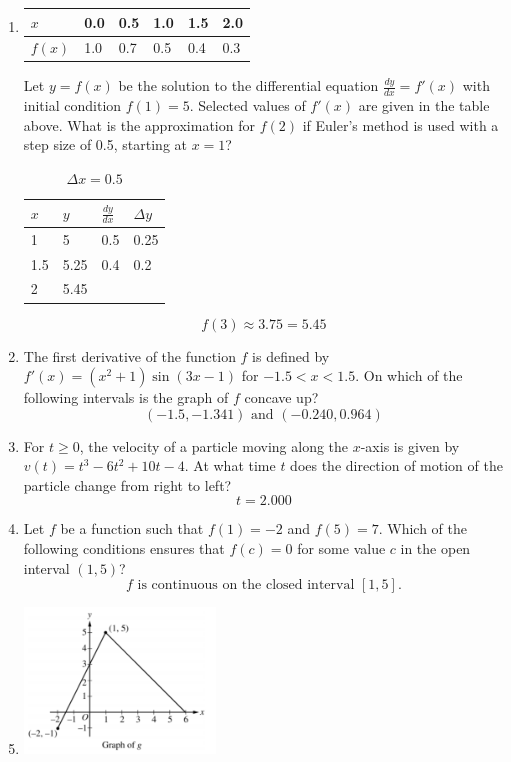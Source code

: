 \documentclass[12pt]{article}
\begin{document}
\begin{enumerate}
    \item 
    \begin{table}[h!]
        \centering
        \begin{tabular}{|l||l|l|l|l|l|}
        \hline
        $x$    & 0.0 & 0.5 & 1.0 & 1.5 & 2.0 \\ \hline
        $f(x)$ & 1.0  & 0.7  & 0.5  & 0.4  & 0.3  \\ \hline
        \end{tabular}
        \end{table}
    Let $y = f(x)$  be the solution to the differential equation $\frac{dy}{dx}=f'(x)$ with initial condition  $f(1) = 5$. Selected values of $f'(x)$  are given in the table above. What is the approximation for $f(2)$  if Euler's method is used with a step size of 0.5, starting at $x= 1$?
    \begin{table}[h]
        \centering
        \caption{$\Delta x = 0.5$}
        \begin{tabular}{l|l|l|l}
        $x$ & \multicolumn{1}{l|}{$y$} & \multicolumn{1}{l|}{$\frac{dy}{dx}$} & $\Delta y$ \\ \hline
        1 & 5 & 0.5 & 0.25 \\
        1.5 & 5.25 & 0.4 & 0.2 \\
        2 & 5.45 &  & 
        \end{tabular}
        \end{table}
        $$f(3)\approx 3.75 = \boxed{5.45}$$
    \item The first derivative of the function $f$ is defined by $f'(x) = (x^2 +1)\sin(3x - 1)$ for $-1.5 < x < 1.5$. On which of the following intervals is the graph of $f$ concave up?
    $$\boxed{(-1.5, -1.341) \text{ and } (-0.240, 0.964)}$$
    \item For  $t \geq 0$, the velocity of a particle moving along the $x$-axis is given by  $v(t) =t^3-6t^2+ 10t- 4$. At what time $t$ does the direction of motion of the particle change from right to left?
    $$\boxed{t=2.000}$$
    \item Let $f$ be a function such that $f (1) = -2$ and $f (5) = 7$. Which of the following conditions ensures that $f(c) = 0$ for some value $c$ in the open interval $(1,5)$?
    $$\boxed{\text{$f$ is continuous on the closed interval $[1, 5]$.}}$$
    \item 
        \begin{center}
            \includegraphics[width=2in]{FEP10.png}

\end{center}
\end{enumerate}
\end{document}
